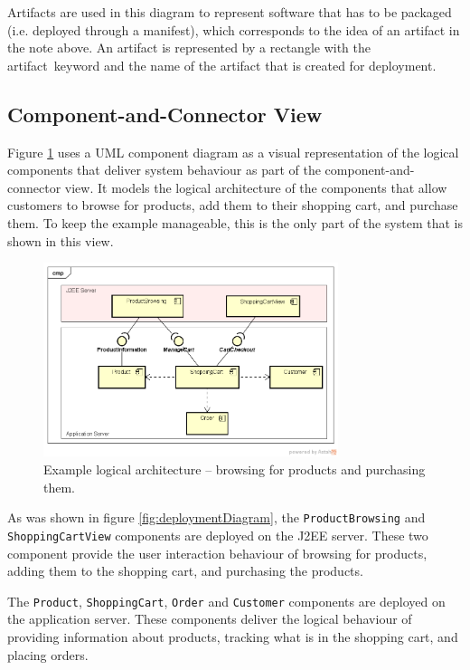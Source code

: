Artifacts are used in this diagram to represent software that has to be packaged
(i.e. deployed through a manifest), which corresponds to the idea of an artifact in the note above.
An artifact is represented by a rectangle with the \guillemotleft artifact\guillemotright~keyword and the name of the artifact that is created for deployment.

\subsection{Component-and-Connector View}\label{sec:cnc_view}
Figure \ref{fig:componentDiagram} uses a UML component diagram as a visual representation of
the logical components that deliver system behaviour as part of the component-and-connector view.
It models the logical architecture of the components that allow customers to browse for products, add them to their shopping cart, and purchase them.
To keep the example manageable, this is the only part of the system that is shown in this view.

\begin{figure}[h]
    \centering
    \includegraphics[trim=39 37 22 49,clip,width=0.77\textwidth]{images/uml/component_diagram.png}
    \caption{Example logical architecture -- browsing for products and purchasing them.}
    \label{fig:componentDiagram}
\end{figure}

\noindent
As was shown in figure \ref{fig:deploymentDiagram}, the \texttt{ProductBrowsing} and \texttt{ShoppingCartView} components are deployed on the J2EE server.
These two component provide the user interaction behaviour of browsing for products, adding them to the shopping cart, and purchasing the products.

The \texttt{Product}, \texttt{ShoppingCart}, \texttt{Order} and \texttt{Customer} components are deployed on the application server.
These components deliver the logical behaviour of providing information about products, tracking what is in the shopping cart, and placing orders.

